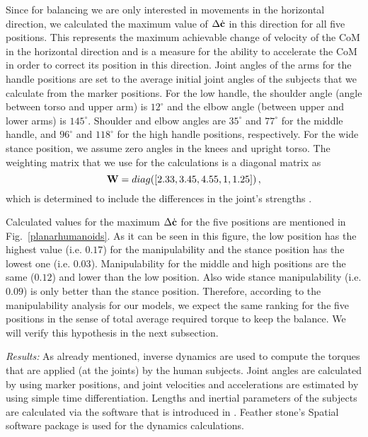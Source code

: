 Since for balancing we are only interested in movements in the horizontal direction, we calculated the maximum value of $\Delta \dot{\mathbf{c}}$ in this direction for all five positions. This represents the maximum achievable change of velocity of the CoM in the horizontal direction and is a measure for the ability to accelerate the CoM in order to correct its position in this direction. Joint angles of the arms for the handle positions are set to the average initial joint angles of the subjects that we calculate from the marker positions. For the low handle, the shoulder angle (angle between torso and upper arm) is $12^\circ$ and the elbow angle (between upper and lower arms) is $145^\circ$. Shoulder and elbow angles are $35^\circ$ and $77^\circ$ for the middle handle, and $96^\circ$ and $118^\circ$ for the high handle positions, respectively. For the wide stance position, we assume zero angles in the knees and upright torso. The weighting matrix that we use for the calculations is a diagonal matrix as
%
\begin{equation}
\mathbf{W} = diag([2.33, 3.45, 4.55, 1, 1.25]) \, ,
\end{equation}
%
which is determined to include the differences in the joint's strengths \cite{Anderson2007, Bober2002, Gandevia1998, Moraux2013}.

Calculated values for the maximum $\Delta \dot{\mathbf{c}}$ for the five positions are mentioned in Fig.~\ref{planarhumanoids}. As it can be seen in this figure, the low position has the highest value (i.e. $0.17$) for the manipulability and the stance position has the lowest one (i.e. $0.03$). Manipulability for the middle and high positions are the same ($0.12$) and lower than the low position. Also wide stance manipulability (i.e. $0.09$) is only better than the stance position. Therefore, according to the manipulability analysis for our models, we expect the same ranking for the five positions in the sense of total average required torque to keep the balance. We will verify this hypothesis in the next subsection.


\textit{Results:} As already mentioned, inverse dynamics are used to compute the torques that are applied (at the joints) by the human subjects. Joint angles are calculated by using marker positions, and joint velocities and accelerations are estimated by using simple time differentiation. Lengths and inertial parameters of the subjects are calculated via the software that is introduced in \cite{Zlajpah&Babic14}. Feather stone's Spatial software package \cite{Featherstone} is used for the dynamics calculations.

